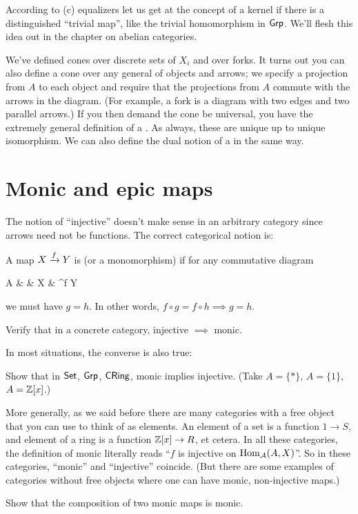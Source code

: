According to (c) equalizers let us get at the concept of a kernel if there is a distinguished
``trivial map'', like the trivial homomorphism in $\mathsf{Grp}$.
We'll flesh this idea out in the chapter on abelian categories.

\begin{remark}
	We've defined cones over discrete sets of $X_i$ and over forks.
	It turns out you can also define a cone over any general  of objects and arrows;
	we specify a projection from $A$ to each object and
	require that the projections from $A$ commute with the arrows in the diagram.
	(For example, a fork is a diagram with two edges and two parallel arrows.)
	If you then demand the cone be universal, you have the extremely general definition of a .
	As always, these are unique up to unique isomorphism.
	We can also define the dual notion of a  in the same way.
\end{remark}

\section{Monic and epic maps}
The notion of ``injective'' doesn't make sense in an arbitrary category since arrows need not be functions.
The correct categorical notion is:
\begin{definition}
	A map $X \xrightarrow{f} Y$ is  (or a monomorphism) if for any commutative diagram
	\begin{diagram}
		A &  & X & \rTo^f Y 
	\end{diagram}
	we must have $g = h$.
	In other words, $f \circ g = f \circ h \implies g = h$.
\end{definition}
\begin{ques}
	Verify that in a concrete category,
	injective $\implies$ monic.
\end{ques}
In most situations, the converse is also true:
\begin{exercise}
	Show that in $\mathsf{Set}$, $\mathsf{Grp}$, $\mathsf{CRing}$,
	monic implies injective. (Take $A = \{\ast\}$, $A = \{1\}$, $A = \mathbb Z[x]$.)
\end{exercise}
More generally, as we said before there are many categories
with a free object that you can use to think of as elements.
An element of a set is a function $1 \to S$, and element of a ring is a function $\mathbb Z[x] \to R$, et cetera.
In all these categories, the definition of monic literally reads ``$f$ is injective on $\operatorname{Hom}_\mathcal A(A, X)$''.
So in these categories, ``monic'' and ``injective'' coincide.
(But there are some examples of categories without free objects where one can have monic,
non-injective maps.)
\begin{ques}
	Show that the composition of two monic maps is monic.
\end{ques}

